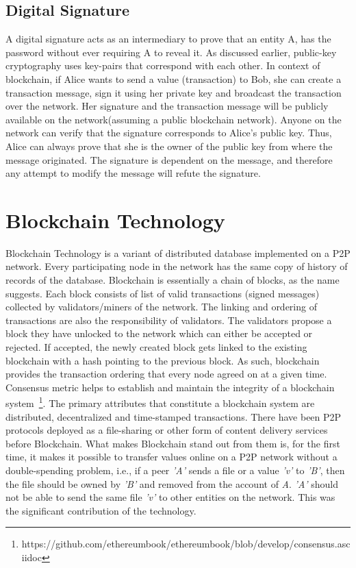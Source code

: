 \subsection{Digital Signature} \label{ss:digitalsignature}
A digital signature acts as an intermediary to prove that an entity A, has the
password without ever requiring A to reveal it. As discussed earlier,
public-key cryptography uses key-pairs that correspond with each other. In
context of blockchain, if Alice wants to send a value (transaction) to Bob, she
can create a transaction message, sign it using her private key and broadcast
the transaction over the network. Her signature and the transaction message
will be publicly available on the network(assuming a public blockchain
network). Anyone on the network can verify that the signature corresponds to
Alice's public key. Thus, Alice can always prove that she is the owner of the
public key from where the message originated. The signature is dependent on the
message, and therefore any attempt to modify the message will refute the
signature.


\section{Blockchain Technology} \label{sec:blockchain}
Blockchain Technology is a variant of distributed database implemented on a P2P
network. Every participating node in the network has the same copy of history
of records of the database. Blockchain is essentially a chain of blocks, as the
name suggests. Each block consists of list of valid transactions (signed
messages) collected by validators/miners of the network. The linking and
ordering of transactions are also the responsibility of validators. The
validators propose a block they have unlocked to the network which can either
be accepted or rejected. If accepted, the newly created block gets linked to
the existing blockchain with a hash pointing to the previous block. As such,
blockchain provides the transaction ordering that every node agreed on at a
given time. Consensus metric helps to establish and maintain the integrity of a
blockchain
system~\footnote{https://github.com/ethereumbook/ethereumbook/blob/develop/consensus.asciidoc}.
The primary attributes that constitute a blockchain system are distributed,
decentralized and time-stamped transactions.  There have been P2P protocols
deployed as a file-sharing or other form of content delivery services before
Blockchain. What makes Blockchain stand out from them is, for the first time,
it makes it possible to transfer values online on a P2P network without a
double-spending problem, i.e., if a peer \textit{'A'} sends a file or a value
\textit{'v'} to \textit{'B'}, then the file should be owned by \textit{'B'} and
removed from the account of \textit{A}. \textit{'A'} should not be able to send
the same file \textit{'v'} to other entities on the network. This was the
significant contribution of the technology. 

